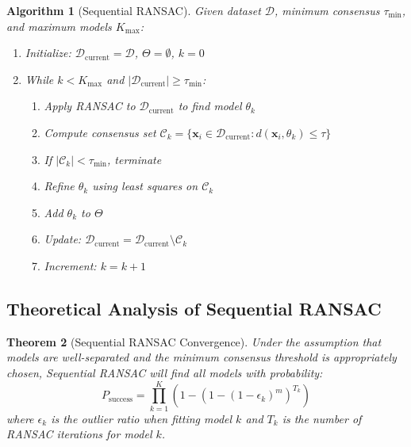 \documentclass[12pt]{article}
\renewcommand{\vec}[1]{\mathbf{#1}}
\newtheorem{theorem}{Theorem}[section]
\newtheorem{algorithm}[theorem]{Algorithm}
\begin{document}
\begin{algorithm}[Sequential RANSAC]
    \label{alg:sequential_ransac}
    Given dataset $\mathcal{D}$, minimum consensus $\tau_{\text{min}}$, and maximum models $K_{\text{max}}$:
    \begin{enumerate}
        \item Initialize: $\mathcal{D}_{\text{current}} = \mathcal{D}$, $\Theta = \emptyset$, $k = 0$
        \item While $k < K_{\text{max}}$ and $|\mathcal{D}_{\text{current}}| \geq \tau_{\text{min}}$:
              \begin{enumerate}
                  \item Apply RANSAC to $\mathcal{D}_{\text{current}}$ to find model $\theta_k$
                  \item Compute consensus set $\mathcal{C}_k = \{\vec{x}_i \in \mathcal{D}_{\text{current}} : d(\vec{x}_i, \theta_k) \leq \tau\}$
                  \item If $|\mathcal{C}_k| < \tau_{\text{min}}$, terminate
                  \item Refine $\theta_k$ using least squares on $\mathcal{C}_k$
                  \item Add $\theta_k$ to $\Theta$
                  \item Update: $\mathcal{D}_{\text{current}} = \mathcal{D}_{\text{current}} \setminus \mathcal{C}_k$
                  \item Increment: $k = k + 1$
              \end{enumerate}
    \end{enumerate}
\end{algorithm}

\subsection{Theoretical Analysis of Sequential RANSAC}
\label{subsec:sequential_analysis}

\begin{theorem}[Sequential RANSAC Convergence]
    \label{thm:sequential_convergence}
    Under the assumption that models are well-separated and the minimum consensus threshold is appropriately chosen, Sequential RANSAC will find all models with probability:
    \begin{equation}
        P_{\text{success}} = \prod_{k=1}^K \left(1 - \left(1 - (1-\epsilon_k)^m\right)^{T_k}\right)
        \label{eq:sequential_success_prob}
    \end{equation}
    where $\epsilon_k$ is the outlier ratio when fitting model $k$ and $T_k$ is the number of RANSAC iterations for model $k$.
\end{theorem}
\end{document}
